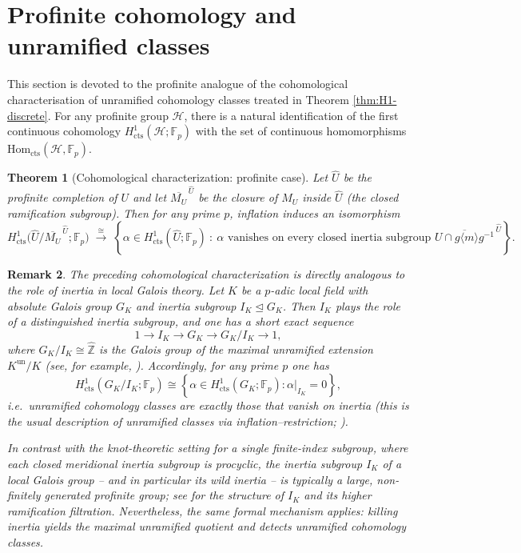 \documentclass[11pt]{article}
\newtheorem{theorem}{Theorem}[section]
\newtheorem{remark}[theorem]{Remark}
\begin{document}
\section{Profinite cohomology and unramified classes}

This section is devoted to the profinite analogue of the cohomological characterisation of unramified cohomology classes treated in Theorem \ref{thm:H1-discrete}.
For any profinite group $\mathcal H$, there is a natural identification of the first continuous cohomology $H^1_{\mathrm{cts}}(\mathcal H;\mathbb F_p)$ with the set of continuous homomorphisms $\mathrm{Hom}_{\mathrm{cts}}(\mathcal H,\mathbb F_p)$.

\begin{theorem}[Cohomological characterization: profinite case]\label{thm:H1-profinite}
	Let $\widehat U$ be the profinite completion of $U$ and let $\overline{M_U}^{\,\widehat U}$ be the closure of $M_U$ inside $\widehat U$ (the closed ramification subgroup). Then for any prime $p$, inflation induces an isomorphism
	\[ H^1_{\mathrm{cts}}\!\big(\widehat U/\overline{M_U}^{\,\widehat U};\mathbb F_p\big) \;\xrightarrow{\ \cong\ }\; \left\{ \alpha\in H^1_{\mathrm{cts}}(\widehat U;\mathbb F_p)\ :\ \alpha \text{ vanishes on every closed inertia subgroup } \overline{U\cap g\langle m\rangle g^{-1}}^{\,\widehat U} \right\}.\]
\end{theorem}

\begin{remark}%
	The preceding cohomological characterization is directly analogous to the role of inertia in local Galois theory. Let $K$ be a $p$-adic local field with absolute Galois group $G_K$ and inertia subgroup $I_K \trianglelefteq G_K$. Then $I_K$ plays the role of a distinguished inertia subgroup, and one has a short exact sequence
	\[1 \longrightarrow I_K \longrightarrow G_K \longrightarrow G_K/I_K \longrightarrow 1,\]
	where $G_K/I_K \cong \widehat{\mathbb{Z}}$ is the Galois group of the maximal unramified extension $K^{\mathrm{un}}/K$ (see, for example, \cite[Chap.~VII, \S 5]{NSW}). Accordingly, for any prime $p$ one has
	\[H^1_{\mathrm{cts}}(G_K/I_K;\mathbb{F}_p) \cong \left\{ \alpha \in H^1_{\mathrm{cts}}(G_K;\mathbb{F}_p) : \alpha|_{I_K} = 0 \right\},\]
	i.e.\ unramified cohomology classes are exactly those that vanish on inertia (this is the usual description of unramified classes via inflation–restriction;  \cite[Chap.~II, \S4 and Chap.~VII, \S2]{NSW}).
	
	In contrast with the knot-theoretic setting for a single finite-index subgroup, where each closed meridional inertia subgroup is procyclic, the inertia subgroup $I_K$ of a local Galois group -- and in particular its wild inertia -- is typically a large, non-finitely generated profinite group; see \cite[Chap.~VII, \S 5]{NSW} for the structure of $I_K$ and its higher ramification filtration.
	Nevertheless, the same formal mechanism applies: killing inertia yields the maximal unramified quotient and detects unramified cohomology classes.
\end{remark}
\end{document}
